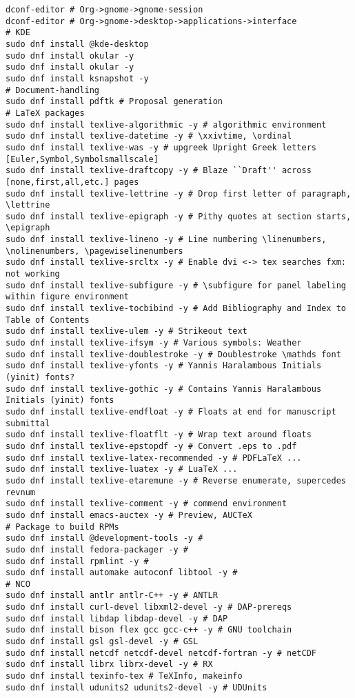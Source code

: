 \documentclass[12pt,twoside]{article}
\begin{document}
\begin{verbatim}
dconf-editor # Org->gnome->gnome-session
dconf-editor # Org->gnome->desktop->applications->interface
# KDE
sudo dnf install @kde-desktop
sudo dnf install okular -y 
sudo dnf install okular -y
sudo dnf install ksnapshot -y
# Document-handling
sudo dnf install pdftk # Proposal generation
# LaTeX packages
sudo dnf install texlive-algorithmic -y # algorithmic environment
sudo dnf install texlive-datetime -y # \xxivtime, \ordinal
sudo dnf install texlive-was -y # upgreek Upright Greek letters [Euler,Symbol,Symbolsmallscale]
sudo dnf install texlive-draftcopy -y # Blaze ``Draft'' across [none,first,all,etc.] pages
sudo dnf install texlive-lettrine -y # Drop first letter of paragraph, \lettrine
sudo dnf install texlive-epigraph -y # Pithy quotes at section starts, \epigraph
sudo dnf install texlive-lineno -y # Line numbering \linenumbers, \nolinenumbers, \pagewiselinenumbers
sudo dnf install texlive-srcltx -y # Enable dvi <-> tex searches fxm: not working
sudo dnf install texlive-subfigure -y # \subfigure for panel labeling within figure environment
sudo dnf install texlive-tocbibind -y # Add Bibliography and Index to Table of Contents
sudo dnf install texlive-ulem -y # Strikeout text
sudo dnf install texlive-ifsym -y # Various symbols: Weather
sudo dnf install texlive-doublestroke -y # Doublestroke \mathds font
sudo dnf install texlive-yfonts -y # Yannis Haralambous Initials (yinit) fonts?
sudo dnf install texlive-gothic -y # Contains Yannis Haralambous Initials (yinit) fonts
sudo dnf install texlive-endfloat -y # Floats at end for manuscript submittal
sudo dnf install texlive-floatflt -y # Wrap text around floats
sudo dnf install texlive-epstopdf -y # Convert .eps to .pdf
sudo dnf install texlive-latex-recommended -y # PDFLaTeX ...
sudo dnf install texlive-luatex -y # LuaTeX ...
sudo dnf install texlive-etaremune -y # Reverse enumerate, supercedes revnum
sudo dnf install texlive-comment -y # commend environment
sudo dnf install emacs-auctex -y # Preview, AUCTeX
# Package to build RPMs
sudo dnf install @development-tools -y #
sudo dnf install fedora-packager -y #
sudo dnf install rpmlint -y # 
sudo dnf install automake autoconf libtool -y #
# NCO
sudo dnf install antlr antlr-C++ -y # ANTLR
sudo dnf install curl-devel libxml2-devel -y # DAP-prereqs
sudo dnf install libdap libdap-devel -y # DAP
sudo dnf install bison flex gcc gcc-c++ -y # GNU toolchain
sudo dnf install gsl gsl-devel -y # GSL
sudo dnf install netcdf netcdf-devel netcdf-fortran -y # netCDF
sudo dnf install librx librx-devel -y # RX
sudo dnf install texinfo-tex # TeXInfo, makeinfo
sudo dnf install udunits2 udunits2-devel -y # UDUnits

\end{verbatim}
\end{document}
